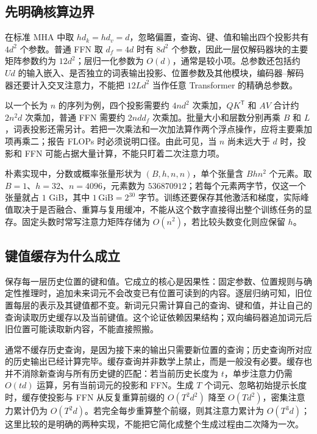 \documentclass[UTF8,12pt,a4paper,fontset=fandol]{ctexart}
\begin{document}
\subsection{先明确核算边界}

在标准 MHA 中取 $hd_k=hd_v=d$，忽略偏置，查询、键、值和输出四个投影共有 $4d^2$ 个参数。普通 FFN 取 $d_f=4d$ 时有 $8d^2$ 个参数，因此一层仅解码器块的主要矩阵参数约为 $12d^2$；层归一化参数为 $O(d)$，通常是较小项。总参数还包括约 $Ud$ 的输入嵌入、是否独立的词表输出投影、位置参数及其他模块，编码器--解码器还要计入交叉注意力，不能把 $12Ld^2$ 当作任意 Transformer 的精确总参数。

以一个长为 $n$ 的序列为例，四个投影需要约 $4nd^2$ 次乘加，$QK^{\mathsf T}$ 和 $AV$ 合计约 $2n^2d$ 次乘加，普通 FFN 需要约 $2ndd_f$ 次乘加。批量大小和层数分别再乘 $B$ 和 $L$，词表投影还需另计。若把一次乘法和一次加法算作两个浮点操作，应将主要乘加项再乘二；报告 FLOPs 时必须说明口径。由此可见，当 $n$ 尚未远大于 $d$ 时，投影和 FFN 可能占据大量计算，不能只盯着二次注意力项。

朴素实现中，分数或概率张量形状为 $(B,h,n,n)$，单个张量含 $Bhn^2$ 个元素。取 $B=1$、$h=32$、$n=4096$，元素数为 $536870912$；若每个元素两字节，仅这一个张量就占 $1$ GiB，其中 $1\,\mathrm{GiB}=2^{30}$ 字节。训练还要保存其他激活和梯度，实际峰值取决于是否融合、重算与复用缓冲，不能从这个数字直接得出整个训练任务的显存。固定头数时常写注意力矩阵存储为 $O(n^2)$，若比较头数变化则应保留 $h$。

\subsection{键值缓存为什么成立}

保存每一层历史位置的键和值。它成立的核心是因果性：固定参数、位置规则与确定性推理时，追加未来词元不会改变已有位置可读到的内容。逐层归纳可知，旧位置每层的表示及其键值都不变。新词元只需计算自己的查询、键和值，并让自己的查询读取历史缓存以及当前键值。这个论证依赖因果结构；双向编码器追加词元后旧位置可能读取新内容，不能直接照搬。

通常不缓存历史查询，是因为接下来的输出只需要新位置的查询；历史查询所对应的历史输出已经计算完毕。缓存查询并非数学上禁止，而是一般没有必要。缓存也并不消除新查询与所有历史键的匹配：若当前历史长度为 $t$，单步注意力仍需 $O(td)$ 运算，另有当前词元的投影和 FFN。生成 $T$ 个词元、忽略初始提示长度时，缓存使投影与 FFN 从反复重算前缀的 $O(T^2d^2)$ 降至 $O(Td^2)$，密集注意力累计仍为 $O(T^2d)$。若完全每步重算整个前缀，则其注意力累计为 $O(T^3d)$；这里比较的是明确的两种实现，不能把它简化成整个生成过程由二次降为一次。
\end{document}
